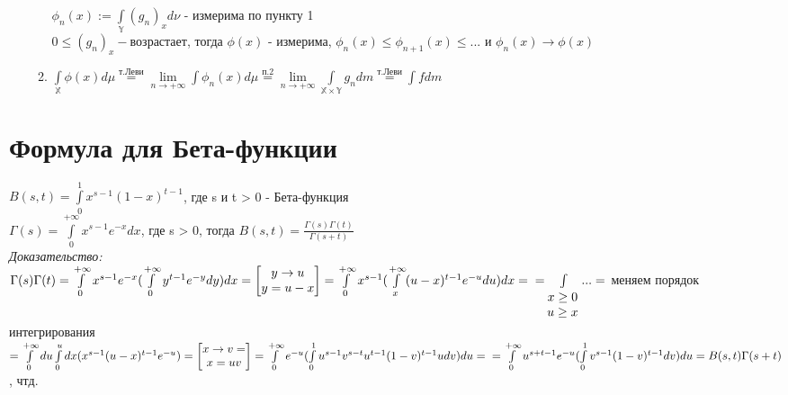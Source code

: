 \documentclass[paper=a4, fontsize=17pt]{article}
\begin{document}
\begin{enumerate}
\begin{enumerate}
		$\phi_n(x) := \int\limits_{\mathds{Y}}(g_n)_xd\nu$ - измерима по пункту 1 \\
		$0 \leq (g_n)_x - \text{возрастает}$, тогда $\phi(x)$ - измерима, $\phi_n(x) \leq \phi_{n+1}(x) \leq ...$ и $\phi_n(x) \rightarrow \phi(x)$
		\item $\int\limits_{\mathds{X}}\phi(x)d\mu \overset{\text{т.Леви}}{=} \lim\limits_{n \rightarrow +\infty}\int\phi_n(x)d\mu \overset{\text{п.2}}{=}\lim\limits_{n \rightarrow +\infty}\int\limits_{\mathds{X} \times \mathds{Y}}g_ndm \overset{\text{т.Леви}}{=} \int fdm$
	\end{enumerate}
\end{enumerate}

\section{Формула для Бета-функции}
$B(s, t) = \int\limits_{0}^{1}x^{s-1}(1-x)^{t-1}$, где s и t > 0 - Бета-функция \\
$\Gamma(s) = \int\limits_{0}^{+\infty}x^{s-1}e^{-x}dx$, где s > 0, тогда $B(s, t) = \frac{\Gamma(s)\Gamma(t)}{\Gamma(s+t)}$ \\
\emph{Доказательство:}\\
$\Gamma(s)\Gamma(t) = \int\limits_{0}^{+\infty}x^{s-1}e^{-x}(\int\limits_{0}^{+\infty}y^{t-1}e^{-y}dy)dx = 
\begin{bmatrix}y \rightarrow u \\ y = u - x \end{bmatrix} =
\int\limits_{0}^{+\infty}x^{s-1}(\int\limits_{x}^{+\infty}(u-x)^{t-1}e^{-u}du)dx=\\ 
= \int\limits_{\begin{matrix}x \geq 0 \\ u \geq x \end{matrix}}...=$ меняем порядок интегрирования\\
$= \int\limits_{0}^{+\infty}du\int\limits_{0}^{u}dx (x^{s-1}(u-x)^{t-1}e^{-u})
= \begin{bmatrix} x \rightarrow v =\\ x = uv \end{bmatrix}
= \int\limits_{0}^{+\infty}e^{-u}(\int\limits_{0}^{1}u^{s-1}v^{s-t}u^{t-1}(1-v)^{t-1}udv)du =\\
= \int\limits_{0}^{+\infty}u^{s+t-1}e^{-u}(\int\limits_{0}^{1}v^{s-1}(1-v)^{t-1}dv)du = B(s,t)\Gamma(s+t)$, чтд.
\end{document}
